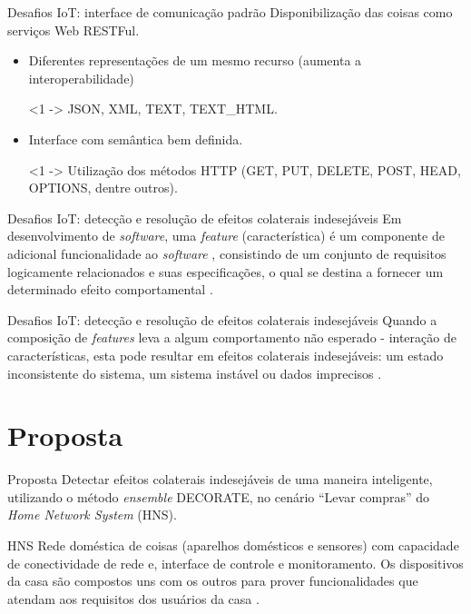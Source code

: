 \documentclass[brazil]{beamer}
\begin{document}
\begin{frame}{Desafios IoT: interface de comunicação padrão}
Disponibilização das coisas como serviços Web RESTFul.
  \begin{itemize}
    \item <1 ->Diferentes representações de um mesmo recurso (aumenta a interoperabilidade)
   \begin{examples}<1 ->
       JSON, XML, TEXT, TEXT\_HTML.
   \end{examples}
    \item <2 - >Interface com semântica bem definida.
   \begin{examples}<1 ->
          Utilização dos métodos HTTP (GET, PUT, DELETE, POST, HEAD, OPTIONS, dentre outros).
   \end{examples}
  \end{itemize}
\end{frame}

\begin{frame}{Desafios IoT: detecção e resolução de efeitos colaterais indesejáveis}
Em desenvolvimento de \textit{software}, uma \alert{\textit{feature} (característica)} é um componente de adicional funcionalidade ao \textit{software} \cite{Calder:2003}, consistindo de um conjunto de requisitos logicamente relacionados e suas especificações, o qual se destina a fornecer um determinado efeito comportamental \cite{NHLABATSI:2008}.
\end{frame}

\begin{frame}{Desafios IoT: detecção e resolução de efeitos colaterais indesejáveis}
Quando a \alert{composição de \textit{features}} leva a algum \alert{comportamento não esperado} - interação de características, esta pode resultar em \alert{efeitos colaterais indesejáveis}: um estado inconsistente do sistema, um sistema instável ou dados imprecisos \cite{NHLABATSI:2008}.
\end{frame}


\section{Proposta}
\begin{frame}{Proposta}
Detectar efeitos colaterais indesejáveis de uma maneira inteligente, utilizando o método \textit{ensemble} DECORATE, no cenário ``Levar compras'' do \textit{Home Network System} (HNS).
\end{frame}

\begin{frame}{HNS}
Rede doméstica de coisas (aparelhos domésticos e sensores) com capacidade de conectividade de rede e, interface de controle e monitoramento. Os dispositivos da casa são compostos uns com os outros para prover funcionalidades que atendam aos requisitos dos usuários da casa \cite{Ikegami:2013}.
\end{frame}
\end{document}
